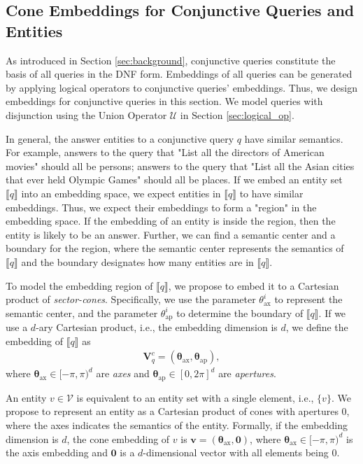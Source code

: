 \documentclass{article}
\newcommand{\gb}[1]{\boldsymbol{#1}}
\newcommand{\taxis}{\text{ax}}
\newcommand{\targ}{\text{ap}}
\begin{document}
\subsection{Cone Embeddings for Conjunctive Queries and Entities}\label{sec:cone_e}
As introduced in Section \ref{sec:background}, conjunctive queries constitute the basis of all queries in the DNF form. Embeddings of all queries can be generated by applying logical operators to conjunctive queries' embeddings. Thus, we design embeddings for conjunctive queries in this section. We model queries with disjunction using the Union Operator $\mathcal{U}$ in Section \ref{sec:logical_op}.

In general, the answer entities to a conjunctive query $q$ have similar semantics. For example, answers to the query that "List all the directors of American movies" should all be persons; answers to the query that "List all the Asian cities that ever held Olympic Games" should all be places. If we embed an entity set $\llbracket q\rrbracket$ into an embedding space, we expect entities in $\llbracket q\rrbracket$ to have similar embeddings. Thus, we expect their embeddings to form a "region" in the embedding space. If the embedding of an entity is inside the region, then the entity is likely to be an answer.  Further, we can find a semantic center and a boundary for the region, where the semantic center represents the semantics of $\llbracket q\rrbracket$ and the boundary designates how many entities are in $\llbracket q\rrbracket$.

To model the embedding region of $\llbracket q\rrbracket$, we propose to embed it to a Cartesian product of \textit{sector-cones}. Specifically, we use the parameter $\theta_{\taxis}^i$ to represent the semantic center, and the parameter $\theta_{\targ}^i$ to determine the boundary of $\llbracket q\rrbracket$. If we use a $d$-ary Cartesian product, i.e., the embedding dimension is $d$, we define the embedding of $\llbracket q\rrbracket$ as
\begin{align*}
    \textbf{V}_q^c=(\gb{\theta}_{\taxis}, \gb{\theta}_{\targ}),
\end{align*}
where $\gb{\theta}_{\taxis}\in[-\pi,\pi)^d$ are \textit{axes} and $\gb{\theta}_{\targ}\in[0,2\pi]^d$ are \textit{apertures}.

An entity $v\in\mathcal{V}$ is equivalent to an entity set with a single element, i.e., $\{v\}$. We propose to represent an entity as a Cartesian product of cones with apertures $0$, where the axes indicates the semantics of the entity. Formally, if the embedding dimension is $d$, the cone embedding of $v$ is $\textbf{v}=(\gb{\theta}_{\taxis},\textbf{0})$, where $\gb{\theta}_{\taxis}\in[-\pi,\pi)^d$ is the axis embedding and $\textbf{0}$ is a $d$-dimensional vector with all elements being $0$.
\end{document}

